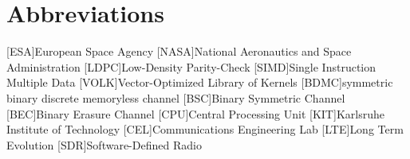 
\section{Abbreviations}
\begin{acronym}[TROLL]
 [ESA]{European Space Agency}
 [NASA]{National Aeronautics and Space Administration}
 [LDPC]{Low-Density Parity-Check}
 [SIMD]{Single Instruction Multiple Data}
 [VOLK]{Vector-Optimized Library of Kernels}
 [BDMC]{symmetric binary discrete memoryless channel}
 [BSC]{Binary Symmetric Channel}
 [BEC]{Binary Erasure Channel}
 [CPU]{Central Processing Unit}
 [KIT]{Karlsruhe Institute of Technology}
 [CEL]{Communications Engineering Lab}
 [LTE]{Long Term Evolution}
 [SDR]{Software-Defined Radio}
\end{acronym}
